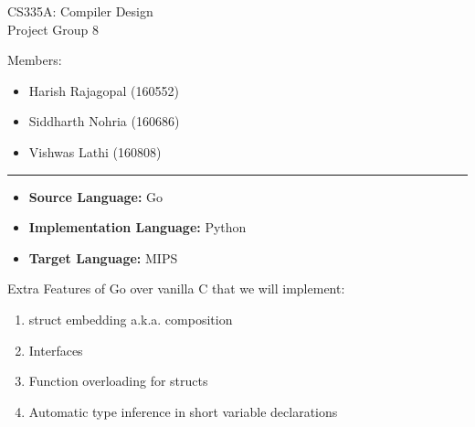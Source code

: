 \documentclass{article}
\begin{document}
    \begin{center}
        \Large
        CS335A: Compiler Design\\
        Project Group 8
        \vspace{1cm}

        Members:
        \begin{itemize}[leftmargin=3cm]
            \item Harish Rajagopal (160552)
            \item Siddharth Nohria (160686)
            \item Vishwas Lathi (160808)
        \end{itemize}
    \end{center}
    \hrule
    \vspace{1.5cm}

    \large
    \begin{itemize}
        \item \textbf{Source Language:} Go
        \item \textbf{Implementation Language:} Python
        \item \textbf{Target Language:} MIPS
    \end{itemize}
    \vspace{7.5mm}

    Extra Features of Go over vanilla C that we will implement:
    \begin{enumerate}
        \item struct embedding a.k.a. composition
        \item Interfaces
        \item Function overloading for structs
        \item Automatic type inference in short variable declarations
    \end{enumerate}
\end{document}
